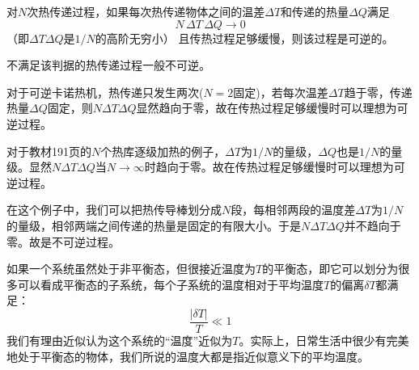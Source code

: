 \documentclass[CJK]{beamer}
\begin{document}
\begin{frame}
\bch
对$N$次热传递过程，如果每次热传递物体之间的温差$\Delta T$和传递的热量$\Delta Q$满足
{\blue $$N\, \Delta T\,\Delta Q\rightarrow 0$$}
（即$\Delta T\Delta Q$是$1/N$的高阶无穷小）
且{\blue 传热过程足够缓慢}，则该过程是{\blue 可逆}的。

不满足该判据的热传递过程一般不可逆。

\ech
\end{frame}

\begin{frame}
\bch
\bex
对于可逆卡诺热机，热传递只发生两次($N=2$固定)，若每次温差$\Delta T$趋于零，传递热量$\Delta Q$固定，则$N\Delta T\Delta Q$显然趋向于零，故在传热过程足够缓慢时可以理想为可逆过程。
\eex
\ech
\end{frame}

\begin{frame}
\bch
\bex
对于教材191页的$N$个热库逐级加热的例子，$\Delta T$为$1/N$的量级，$\Delta Q$也是$1/N$的量级。显然$N\Delta T\Delta Q$当$N\rightarrow \infty$时趋向于零。故在传热过程足够缓慢时可以理想为可逆过程。
\eex
\ech
\end{frame}


\begin{frame}
\bch


在这个例子中，我们可以把热传导棒划分成$N$段，每相邻两段的温度差$\Delta T$为$1/N$的量级，相邻两端之间传递的热量是固定的有限大小。于是$N\Delta T \Delta Q$并不趋向于零。故是不可逆过程。
\ech
\end{frame}



\begin{frame}
\bch
如果一个系统虽然处于非平衡态，但很接近温度为$T$的平衡态，即它可以划分为很多可以看成平衡态的子系统，每个子系统的温度相对于平均温度$T$的偏离$\delta T$都满足：
$$ \frac{|\delta T|}{T} \ll 1$$
我们有理由近似认为这个系统的“温度”近似为$T$。实际上，日常生活中很少有完美地处于平衡态的物体，我们所说的温度大都是指近似意义下的平均温度。
\ech
\end{frame}
\end{document}
